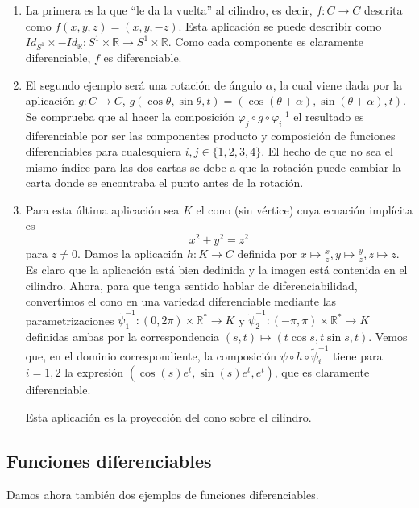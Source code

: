 \documentclass[twoside, 11pt]{article}
\theoremstyle{definition}
\newcommand{\R}{\mathbb{R}}
\begin{document}
\begin{enumerate}


\item La primera es la que ``le da la vuelta'' al cilindro, es decir, $f:C\to C$ descrita como $f(x,y,z)=(x,y,-z)$. Esta aplicación se puede describir como $Id_{S^1}\times -Id_{\R}:S^1\times\R\to S^1\times\R$. Como cada componente es claramente diferenciable, $f$ es diferenciable. 

\item El segundo ejemplo será una rotación de ángulo $\alpha$, la cual viene dada por la aplicación $g:C\to C$, $g(\cos\theta,\sin\theta, t)=(\cos(\theta+\alpha), \sin(\theta+\alpha), t)$. Se comprueba que al hacer la composición $\varphi_j\circ g\circ \varphi^{-1}_i$ el resultado es diferenciable por ser las componentes producto y composición de funciones diferenciables para cualesquiera $i,j\in\{1,2,3,4\}$. El hecho de que no sea el mismo índice para las dos cartas se debe a que la rotación puede cambiar la carta donde se encontraba el punto antes de la rotación. 

\item Para esta última aplicación sea $K$ el cono (sin vértice) cuya ecuación implícita es $$x^2+y^2=z^2$$ para $z\neq 0$. Damos la aplicación $h:K\to C$ definida por $x\mapsto \frac{x}{z}, y\mapsto \frac{y}{z}, z\mapsto z$. Es claro que la aplicación está bien dedinida y la imagen está contenida en el cilindro. Ahora, para que tenga sentido hablar de diferenciabilidad, convertimos el cono en una variedad diferenciable mediante las parametrizaciones $\widetilde{\psi}_1^{-1}:(0,2\pi)\times\R^*\to K$ y $\widetilde{\psi}_2^{-1}:(-\pi,\pi)\times\R^*\to K$ definidas ambas por la correspondencia $(s,t)\mapsto (t\cos s, t\sin s, t)$. Vemos que, en el dominio correspondiente, la composición $\psi\circ h\circ \widetilde{\psi}_i^{-1}$ tiene para $i=1,2$  la expresión $(\cos(s)e^t, \sin(s)e^t, e^t)$, que es claramente diferenciable. 

Esta aplicación es la proyección del cono sobre el cilindro. 


\end{enumerate}

\subsection{Funciones diferenciables}

Damos ahora también dos ejemplos de funciones diferenciables. 
\end{document}
